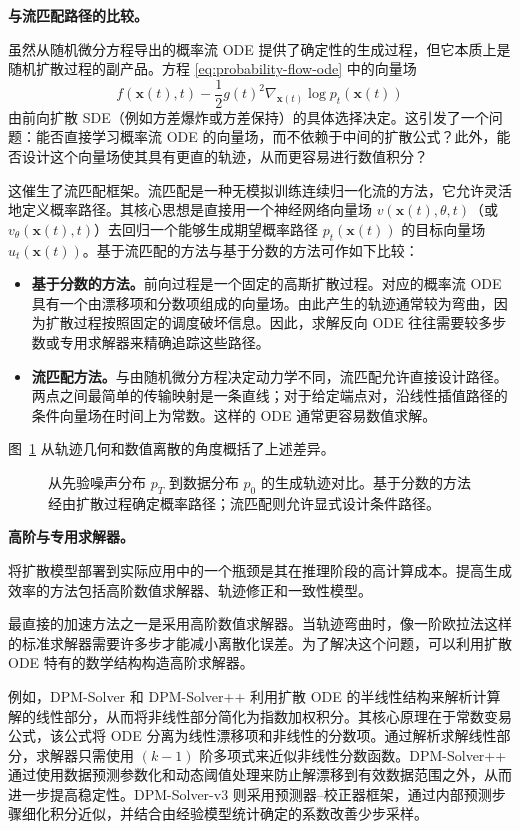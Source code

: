 \documentclass[UTF8,a4paper,zihao=-4,oneside,openany]{ctexbook}
\makeatletter
\newcommand{\AMLFigure}[2][0.96\linewidth]{%
  \begingroup
  \let\AtBeginDocument\@gobble
  \endgroup
}
\makeatother
\begin{document}
\textbf{与流匹配路径的比较。}

虽然从随机微分方程导出的概率流 ODE 提供了确定性的生成过程，但它本质上是随机扩散过程的副产品。方程 \eqref{eq:probability-flow-ode} 中的向量场
\[
f(\mathbf{x}(t), t)-\frac{1}{2}g(t)^2
\nabla_{\mathbf{x}(t)}\log p_t(\mathbf{x}(t))
\]
由前向扩散 SDE（例如方差爆炸或方差保持）的具体选择决定。这引发了一个问题：能否直接学习概率流 ODE 的向量场，而不依赖于中间的扩散公式？此外，能否设计这个向量场使其具有更直的轨迹，从而更容易进行数值积分？

这催生了流匹配框架。流匹配是一种无模拟训练连续归一化流的方法，它允许灵活地定义概率路径。其核心思想是直接用一个神经网络向量场 $v(\mathbf{x}(t), \theta, t)$（或 $v_{\theta}(\mathbf{x}(t), t)$）去回归一个能够生成期望概率路径 $p_t(\mathbf{x}(t))$ 的目标向量场 $u_t(\mathbf{x}(t))$。基于流匹配的方法与基于分数的方法可作如下比较：
\begin{itemize}
\item \textbf{基于分数的方法。}前向过程是一个固定的高斯扩散过程。对应的概率流 ODE 具有一个由漂移项和分数项组成的向量场。由此产生的轨迹通常较为弯曲，因为扩散过程按照固定的调度破坏信息。因此，求解反向 ODE 往往需要较多步数或专用求解器来精确追踪这些路径。
\item \textbf{流匹配方法。}与由随机微分方程决定动力学不同，流匹配允许直接设计路径。两点之间最简单的传输映射是一条直线；对于给定端点对，沿线性插值路径的条件向量场在时间上为常数。这样的 ODE 通常更容易数值求解。
\end{itemize}

图~\ref{fig:fm-vs-diffusion} 从轨迹几何和数值离散的角度概括了上述差异。

\begin{figure}[!t]
\centering
\AMLFigure{figure-flow-matching-vs-diffusion}
\caption{从先验噪声分布 $p_T$ 到数据分布 $p_0$ 的生成轨迹对比。基于分数的方法经由扩散过程确定概率路径；流匹配则允许显式设计条件路径。}
\label{fig:fm-vs-diffusion}
\end{figure}

\textbf{高阶与专用求解器。}

将扩散模型部署到实际应用中的一个瓶颈是其在推理阶段的高计算成本。提高生成效率的方法包括高阶数值求解器、轨迹修正和一致性模型。

最直接的加速方法之一是采用高阶数值求解器。当轨迹弯曲时，像一阶欧拉法这样的标准求解器需要许多步才能减小离散化误差。为了解决这个问题，可以利用扩散 ODE 特有的数学结构构造高阶求解器。

例如，DPM-Solver 和 DPM-Solver++ 利用扩散 ODE 的半线性结构来解析计算解的线性部分，从而将非线性部分简化为指数加权积分。其核心原理在于常数变易公式，该公式将 ODE 分离为线性漂移项和非线性的分数项。通过解析求解线性部分，求解器只需使用 $(k-1)$ 阶多项式来近似非线性分数函数。DPM-Solver++ 通过使用数据预测参数化和动态阈值处理来防止解漂移到有效数据范围之外，从而进一步提高稳定性。DPM-Solver-v3 则采用预测器--校正器框架，通过内部预测步骤细化积分近似，并结合由经验模型统计确定的系数改善少步采样。
\end{document}
